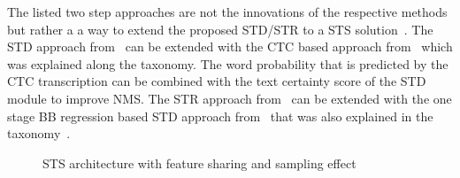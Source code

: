 The listed two step approaches are not the innovations of the respective methods but rather a
a way to extend the proposed \ac{STD}/\ac{STR} to a \ac{STS}
solution~\citep{liao_textboxes_2018,shi_aster_2019}.
The \ac{STD} approach from~\cite{liao_textboxes_2018} can be extended with the \ac{CTC} based
approach from~\cite{shi_end--end_2017} which was explained along the taxonomy.
The word probability that is predicted by the \ac{CTC} transcription can be combined with the
text certainty score of the \ac{STD} module to improve \ac{NMS}.
The \ac{STR} approach from~\cite{shi_aster_2019} can be extended with the one stage
\ac{BB} regression based \ac{STD} approach from~\cite{liao_textboxes_2017} that was also explained
in the taxonomy~\citep{shi_aster_2019}.
\begin{figure}[ht]
    \centering
    \caption[STS architecture with feature sharing]{%
        STS architecture with feature sharing and sampling
        effect~\citep{liu_fots_2018}\label{fig:2-stage-example-LIU-Fots-2018}
    }
\end{figure}


